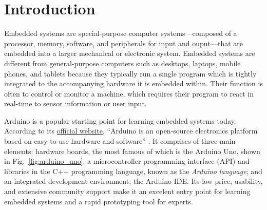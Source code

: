 \chapter{Introduction}
Embedded systems \parencite{leveson_embedded_2003} are special-purpose computer systems---composed of a processor, memory, software, and peripherals for input and ouput---that are embedded into a larger mechanical or electronic system.
Embedded systems are different from general-purpose computers such as desktops, laptops, mobile phones, and tablets because they typically run a single program which is tightly integrated to the accompanying hardware it is embedded within.
Their function is often to control or monitor a machine, which requires their program to react in real-time to sensor information or user input.

Arduino is a popular starting point for learning embedded systems today.
According to its \href{https://www.arduino.cc/en/Guide/Introduction}{official website}, 
``Arduino is an open-source electronics platform based on easy-to-use hardware and software'' \parencite{arduino_what_2018}.
It comprises of three main elements: 
hardware boards, the most famous of which is the Arduino Uno, shown in Fig.~\ref{fig:arduino_uno};
a microcontroller programming interface (API) and libraries in the C++ programming language, known as the \emph{Arduino language};
and an integrated development environment, the Arduino IDE.
Its low price, usability, and extensive community support make it an excelent entry point for learning embedded systems and a rapid prototyping tool for experts.

